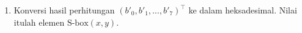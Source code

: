 \begin{enumerate}
\begin{equation}
    \oplus
    \begin{bmatrix} 1 \\ 1 \\ 0 \\ 0 \\ 0 \\ 1 \\ 1 \\ 0 \end{bmatrix}.
    \label{eq:aes-sbox-affine}
    \end{equation}
    \item Konversi hasil perhitungan $(b'_0, b'_1, \dots, b'_7)^{\top}$ ke dalam
    heksadesimal. Nilai itulah elemen $\text{S-box}(x,y)$.
\end{enumerate}


